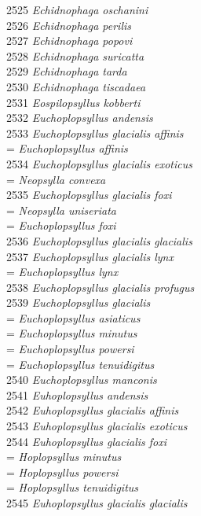 \documentclass[
]{article}
\begin{document}
2525 \emph{Echidnophaga oschanini}\\
2526 \emph{Echidnophaga perilis}\\
2527 \emph{Echidnophaga popovi}\\
2528 \emph{Echidnophaga suricatta}\\
2529 \emph{Echidnophaga tarda}\\
2530 \emph{Echidnophaga tiscadaea}\\
2531 \emph{Eospilopsyllus kobberti}\\
2532 \emph{Euchoplopsyllus andensis}\\
2533 \emph{Euchoplopsyllus glacialis affinis}\\
= \emph{Euchoplopsyllus affinis}\\
2534 \emph{Euchoplopsyllus glacialis exoticus}\\
= \emph{Neopsylla convexa}\\
2535 \emph{Euchoplopsyllus glacialis foxi}\\
= \emph{Neopsylla uniseriata}\\
= \emph{Euchoplopsyllus foxi}\\
2536 \emph{Euchoplopsyllus glacialis glacialis}\\
2537 \emph{Euchoplopsyllus glacialis lynx}\\
= \emph{Euchoplopsyllus lynx}\\
2538 \emph{Euchoplopsyllus glacialis profugus}\\
2539 \emph{Euchoplopsyllus glacialis}\\
= \emph{Euchoplopsyllus asiaticus}\\
= \emph{Euchoplopsyllus minutus}\\
= \emph{Euchoplopsyllus powersi}\\
= \emph{Euchoplopsyllus tenuidigitus}\\
2540 \emph{Euchoplopsyllus manconis}\\
2541 \emph{Euhoplopsyllus andensis}\\
2542 \emph{Euhoplopsyllus glacialis affinis}\\
2543 \emph{Euhoplopsyllus glacialis exoticus}\\
2544 \emph{Euhoplopsyllus glacialis foxi}\\
= \emph{Hoplopsyllus minutus}\\
= \emph{Hoplopsyllus powersi}\\
= \emph{Hoplopsyllus tenuidigitus}\\
2545 \emph{Euhoplopsyllus glacialis glacialis}\\
\end{document}
